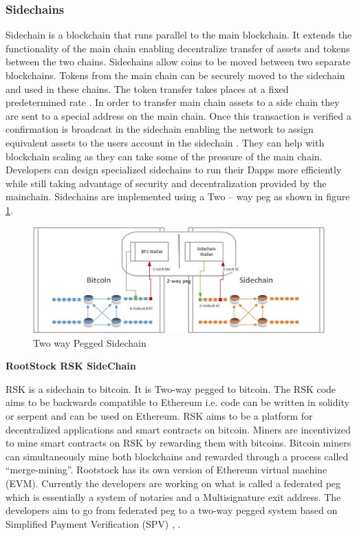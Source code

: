 \subsubsection{Sidechains}
Sidechain is a blockchain that runs parallel to the main blockchain. It extends the functionality of the main chain enabling decentralize transfer of assets and tokens between the two chains. Sidechains allow coins to be moved between two separate blockchains. Tokens from the main chain can be securely moved to the sidechain and used in these chains. The token transfer takes places at a fixed predetermined rate \cite{misc:013}. In order to transfer main chain assets to a side chain they are sent to a special address on the main chain. Once this transaction is verified a confirmation is broadcast in the sidechain enabling the network to assign equivalent assets to the users account in the sidechain \cite{paper:004}. They can help with blockchain scaling as they can take some of the pressure of the main chain. Developers can design specialized sidechains to run their Dapps more efficiently while still taking advantage of security and decentralization provided by the mainchain. Sidechains are implemented using a Two – way peg as shown in figure \ref{fig:SC}.
\begin{figure}[h]
	\centering
    \includegraphics[width=160mm,scale=1]{figs/sidechain}
	\caption{Two way Pegged Sidechain }
	\label{fig:SC}
\end{figure}

\textbf{RootStock RSK SideChain}

RSK is a sidechain to bitcoin. It is Two-way pegged to bitcoin. The RSK code aims to be backwards compatible to Ethereum i.e. code can be written in solidity or serpent and can be used on Ethereum. RSK aims to be a platform for decentralized applications and smart contracts on bitcoin. Miners are incentivized to mine smart contracts on RSK by rewarding them with bitcoins. Bitcoin miners can simultaneously mine both blockchains and rewarded through a process called “merge-mining”. Rootstock has its own version of Ethereum virtual machine (EVM). Currently the developers are working on what is called a federated peg which is essentially a system of notaries and a Multisignature exit address. The developers aim to go from federated peg to a two-way pegged system based on Simplified Payment Verification (SPV) \cite{andy_mb}, \cite{paper:005}. 

